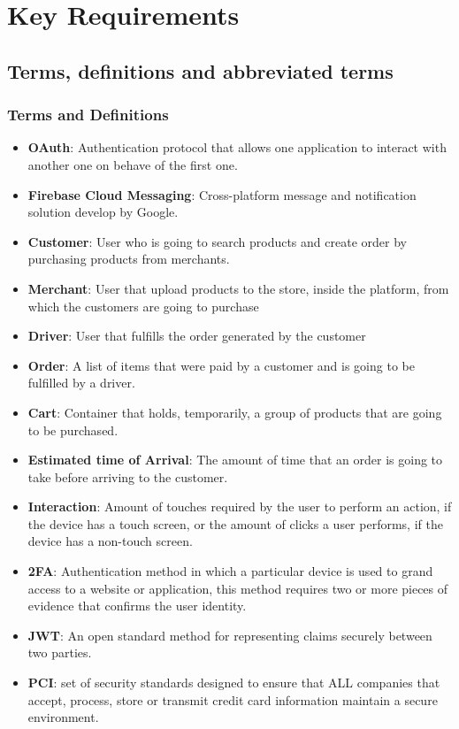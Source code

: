 \section{Key Requirements}
\subsection{Terms, definitions and abbreviated terms}
\subsubsection{Terms and Definitions}
\begin{itemize}
    \item \textbf{OAuth}: Authentication protocol that allows one application 
    to interact with another one on behave of the first one.
    \item \textbf{Firebase Cloud Messaging}: Cross-platform message and 
    notification solution develop by Google.
    \item \textbf{Customer}: User who is going to search products and create 
    order by purchasing products from merchants.
    \item \textbf{Merchant}: User that upload products to the store, 
    inside the platform, from which the customers are going to purchase 
    \item \textbf{Driver}: User that fulfills the order generated by the 
    customer 
    \item \textbf{Order}: A list of items that were paid by a customer and 
    is going to be fulfilled by a driver.
    \item \textbf{Cart}: Container that holds, temporarily, a group of products 
    that are going to be purchased.
    \item \textbf{Estimated time of Arrival}: The amount of time that 
    an order is going to take before arriving to the customer.
    \item \textbf{Interaction}: Amount of touches required by the user to 
    perform an action, if the device has a touch screen, or the amount of 
    clicks a user performs, if the device has a non-touch screen.
    \item \textbf{2FA}: Authentication method in which a particular device is 
    used to grand access to a website or application, this method requires 
    two or more pieces of evidence that confirms the user identity.
    \item \textbf{JWT}: An open standard method for representing claims 
    securely between two parties.
    \item \textbf{PCI}: set of security standards designed to ensure that ALL 
    companies that accept, process, store or transmit credit card 
    information maintain a secure environment. \cite{pci}
\end{itemize}

